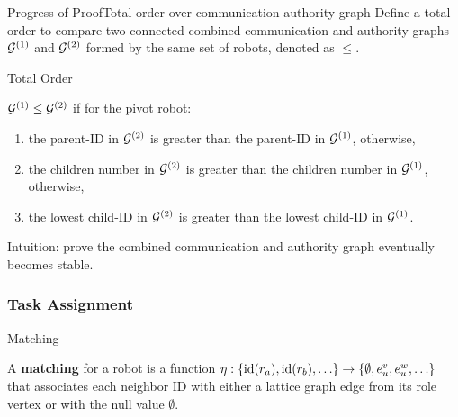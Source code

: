 \documentclass[10pt]{beamer}
\begin{document}
\begin{frame}{Progress of Proof}{Total order over communication-authority graph}
Define a total order to compare two connected combined communication and
authority graphs $\mathcal{G}^{(1)}$ and $\mathcal{G}^{(2)}$ formed by the same set of robots,
denoted as $\leq$.
\begin{block}{Total Order}
\small{
  $\mathcal{G}^{(1)} \leq \mathcal{G}^{(2)}$ if for the pivot robot:
  \begin{enumerate}
  \item the parent-ID in $\mathcal{G}^{(2)}$ is greater than the parent-ID in $\mathcal{G}^{(1)}$,
    otherwise,
  \item the children number in $\mathcal{G}^{(2)}$ is greater than the
    children number in $\mathcal{G}^{(1)}$, otherwise,
  \item the lowest child-ID in $\mathcal{G}^{(2)}$ is greater than the
    lowest child-ID in $\mathcal{G}^{(1)}$.
  \end{enumerate}}
\end{block}

 \textcolor{scred}{\footnotesize{Intuition: prove the combined
      communication and authority graph eventually becomes stable.}}
\end{frame}

\subsubsection[Algorithm: Task Assignment]{Task Assignment}
\begin{frame}{Matching}{}
  \begin{definition}    
    \small{A \textbf{matching} for a robot is a function $\eta : \{{\rm id}(r_a),
      {\rm id}(r_b), \ldots \} \rightarrow \{\emptyset,e_{u}^v, e_{u}^w,
      \ldots\} $ that associates each neighbor ID with either a lattice
      graph edge from its role vertex or with the null value
      $\emptyset$.}
  \end{definition}
  \begin{center}
    
  \end{center}
\end{frame}
\end{document}
